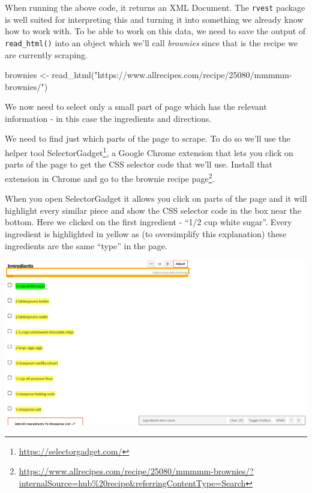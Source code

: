 \documentclass[
]{krantz}
\makeatletter
\newenvironment{Shaded}{\begin{snugshade}}{\end{snugshade}}
\newcommand{\FunctionTok}[1]{\textcolor[rgb]{0,0,0}{#1}}
\newcommand{\NormalTok}[1]{#1}
\newcommand{\OtherTok}[1]{\textcolor[rgb]{0.37,0.37,0.37}{#1}}
\newcommand{\StringTok}[1]{\textcolor[rgb]{0.5,0.5,0.5}{#1}}
\renewcommand{\href}[2]{#2\footnote{\url{#1}}}
\newenvironment{kframe}{%
\medskip{}
\setlength{\fboxsep}{.8em}
 \def\at@end@of@kframe{}%
 \ifinner\ifhmode%
  \def\at@end@of@kframe{\end{minipage}}%
  \begin{minipage}{\columnwidth}%
 \fi\fi%
 \def\FrameCommand##1{\hskip\@totalleftmargin \hskip-\fboxsep
 \colorbox{shadecolor}{##1}\hskip-\fboxsep
     \hskip-\linewidth \hskip-\@totalleftmargin \hskip\columnwidth}%
 \MakeFramed {\advance\hsize-\width
   \@totalleftmargin\z@ \linewidth\hsize
   \@setminipage}}%
 {\par\unskip\endMakeFramed%
 \at@end@of@kframe}
\renewenvironment{Shaded}{\begin{kframe}}{\end{kframe}}
\makeatother
\begin{document}
When running the above code, it returns an XML Document. The \texttt{rvest} package is well suited for interpreting this and turning it into something we already know how to work with. To be able to work on this data, we need to save the output of \texttt{read\_html()} into an object which we'll call \emph{brownies} since that is the recipe we are currently scraping.

\begin{Shaded}
\begin{Highlighting}[]
\NormalTok{brownies }\OtherTok{\textless{}{-}} \FunctionTok{read\_html}\NormalTok{(}\StringTok{"https://www.allrecipes.com/recipe/25080/mmmmm{-}brownies/"}\NormalTok{)}
\end{Highlighting}
\end{Shaded}

We now need to select only a small part of page which has the relevant information - in this case the ingredients and directions.

We need to find just which parts of the page to scrape. To do so we'll use the helper tool \href{https://selectorgadget.com/}{SelectorGadget}, a Google Chrome extension that lets you click on parts of the page to get the CSS selector code that we'll use. Install that extension in Chrome and go to the \href{https://www.allrecipes.com/recipe/25080/mmmmm-brownies/?internalSource=hub\%20recipe\&referringContentType=Search}{brownie recipe page}.

When you open SelectorGadget it allows you click on parts of the page and it will highlight every similar piece and show the CSS selector code in the box near the bottom. Here we clicked on the first ingredient - ``1/2 cup white sugar''. Every ingredient is highlighted in yellow as (to oversimplify this explanation) these ingredients are the same ``type'' in the page.

\includegraphics{images/brownies_3.PNG}
\end{document}
